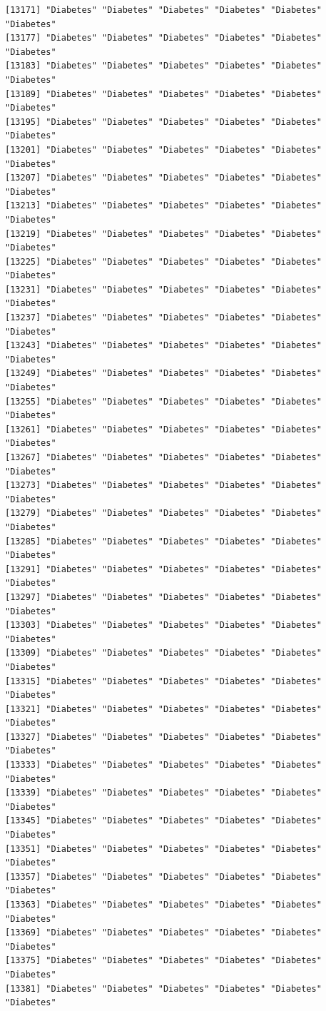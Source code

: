 \documentclass[
  letterpaper,
  DIV=11,
  numbers=noendperiod]{scrartcl}
\begin{document}
\begin{verbatim}
[13171] "Diabetes" "Diabetes" "Diabetes" "Diabetes" "Diabetes" "Diabetes"
[13177] "Diabetes" "Diabetes" "Diabetes" "Diabetes" "Diabetes" "Diabetes"
[13183] "Diabetes" "Diabetes" "Diabetes" "Diabetes" "Diabetes" "Diabetes"
[13189] "Diabetes" "Diabetes" "Diabetes" "Diabetes" "Diabetes" "Diabetes"
[13195] "Diabetes" "Diabetes" "Diabetes" "Diabetes" "Diabetes" "Diabetes"
[13201] "Diabetes" "Diabetes" "Diabetes" "Diabetes" "Diabetes" "Diabetes"
[13207] "Diabetes" "Diabetes" "Diabetes" "Diabetes" "Diabetes" "Diabetes"
[13213] "Diabetes" "Diabetes" "Diabetes" "Diabetes" "Diabetes" "Diabetes"
[13219] "Diabetes" "Diabetes" "Diabetes" "Diabetes" "Diabetes" "Diabetes"
[13225] "Diabetes" "Diabetes" "Diabetes" "Diabetes" "Diabetes" "Diabetes"
[13231] "Diabetes" "Diabetes" "Diabetes" "Diabetes" "Diabetes" "Diabetes"
[13237] "Diabetes" "Diabetes" "Diabetes" "Diabetes" "Diabetes" "Diabetes"
[13243] "Diabetes" "Diabetes" "Diabetes" "Diabetes" "Diabetes" "Diabetes"
[13249] "Diabetes" "Diabetes" "Diabetes" "Diabetes" "Diabetes" "Diabetes"
[13255] "Diabetes" "Diabetes" "Diabetes" "Diabetes" "Diabetes" "Diabetes"
[13261] "Diabetes" "Diabetes" "Diabetes" "Diabetes" "Diabetes" "Diabetes"
[13267] "Diabetes" "Diabetes" "Diabetes" "Diabetes" "Diabetes" "Diabetes"
[13273] "Diabetes" "Diabetes" "Diabetes" "Diabetes" "Diabetes" "Diabetes"
[13279] "Diabetes" "Diabetes" "Diabetes" "Diabetes" "Diabetes" "Diabetes"
[13285] "Diabetes" "Diabetes" "Diabetes" "Diabetes" "Diabetes" "Diabetes"
[13291] "Diabetes" "Diabetes" "Diabetes" "Diabetes" "Diabetes" "Diabetes"
[13297] "Diabetes" "Diabetes" "Diabetes" "Diabetes" "Diabetes" "Diabetes"
[13303] "Diabetes" "Diabetes" "Diabetes" "Diabetes" "Diabetes" "Diabetes"
[13309] "Diabetes" "Diabetes" "Diabetes" "Diabetes" "Diabetes" "Diabetes"
[13315] "Diabetes" "Diabetes" "Diabetes" "Diabetes" "Diabetes" "Diabetes"
[13321] "Diabetes" "Diabetes" "Diabetes" "Diabetes" "Diabetes" "Diabetes"
[13327] "Diabetes" "Diabetes" "Diabetes" "Diabetes" "Diabetes" "Diabetes"
[13333] "Diabetes" "Diabetes" "Diabetes" "Diabetes" "Diabetes" "Diabetes"
[13339] "Diabetes" "Diabetes" "Diabetes" "Diabetes" "Diabetes" "Diabetes"
[13345] "Diabetes" "Diabetes" "Diabetes" "Diabetes" "Diabetes" "Diabetes"
[13351] "Diabetes" "Diabetes" "Diabetes" "Diabetes" "Diabetes" "Diabetes"
[13357] "Diabetes" "Diabetes" "Diabetes" "Diabetes" "Diabetes" "Diabetes"
[13363] "Diabetes" "Diabetes" "Diabetes" "Diabetes" "Diabetes" "Diabetes"
[13369] "Diabetes" "Diabetes" "Diabetes" "Diabetes" "Diabetes" "Diabetes"
[13375] "Diabetes" "Diabetes" "Diabetes" "Diabetes" "Diabetes" "Diabetes"
[13381] "Diabetes" "Diabetes" "Diabetes" "Diabetes" "Diabetes" "Diabetes"

\end{verbatim}
\end{document}
